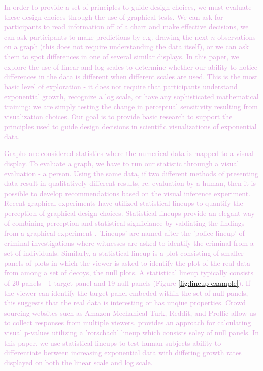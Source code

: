 \documentclass[]{interact}
\theoremstyle{plain}%
\theoremstyle{definition}
\theoremstyle{remark}
\begin{document}
\textcolor{Plum}{
In order to provide a set of principles to guide design choices, we must evaluate these design choices through the use of graphical tests. We can ask for participants to read information off of a chart and make effective decisions, we can ask participants to make predictions by e.g. drawing the next $n$ observations on a graph (this does not require understanding the data itself), or we can ask them to spot differences in one of several similar displays. In this paper, we explore the use of linear and log scales to determine whether our ability to notice differences in the data is different when different scales are used. This is the most basic level of exploration - it does not require that participants understand exponential growth, recognize a log scale, or have any sophisticated mathematical training: we are simply testing the change in perceptual sensitivity resulting from visualization choices. Our goal is to provide basic research to support the principles used to guide design decisions in scientific visualizations of exponential data.}

\textcolor{Plum}{
Graphs are considered statistics where the numerical data is mapped to a visual display.
To evaluate a graph, we have to run our statistic throuugh a visual evaluation - a person. Using the same data, if two different methods of presenting data result in qualitatively different results, re. evaluation by a human, then it is possible to develop recommendations based on the visual inference experiment.  
Recent graphical experiments have utilized statistical lineups to quantify the perception of graphical design choices\citep{vanderplas_clusters_2017}. 
Statistical lineups provide an elegant way of combining perception and statistical signficiance by valdiating the findings from a graphical experiment \citep{buja_statistical_2009, wickham2010graphical, hofmann_graphical_2012, majumder_validation_2013, vanderplas_clusters_2017}.
'Lineups' are named after the 'police lineup' of criminal investigations where witnesses are asked to identify the criminal from a set of individuals. 
Similarly, a statistical lineup is a plot consisting of smaller panels of plots in which the viewer is asked to identify the plot of the real data from among a set of decoys, the null plots. 
A statistical lineup typically consists of 20 panels - 1 target panel and 19 null panels (Figure \ref{fig:lineup-example}). 
If the viewer can identify the target panel embeded within the set of null panels, this suggests that the real data is interesting or has unqiue properties.
Crowd sourcing websites such as Amazon Mechanical Turk, Reddit, and Proflic allow us to collect responses from multiple viewers.
\cite{vanderplas_statistical_nodate} provides an approach for calculating visual p-values utilizing a 'rorschach' lineup which consists soley of null panels.
In this paper, we use statistical lineups to test human subjects ability to differentiate between increasing exponential data with differing growth rates displayed on both the linear scale and log scale.
}
\end{document}

